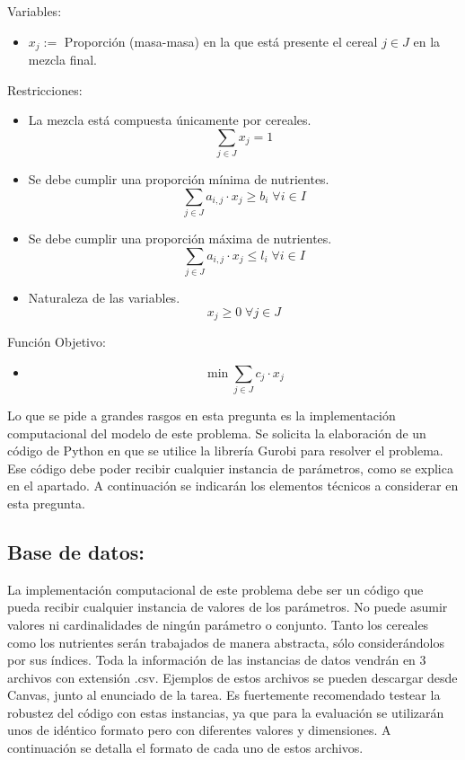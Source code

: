 \documentclass[addpoints,10pt]{exam}
\begin{document}
\begin{questions}
Variables:\\
\begin{itemize}
            \item $x_{j} :=$ Proporción (masa-masa) en la que está presente el cereal $j \in J$ en la mezcla final.
\end{itemize}
Restricciones:
\begin{itemize}
            \item La mezcla está compuesta únicamente por cereales.
            \[ \sum_{j\in J} x_{j} =1 \]            
            \item Se debe cumplir una proporción mínima de nutrientes.
            \[\sum_{j \in J} a_{i,j}\cdot x_{j} \geq b_i \; \forall i \in I \]
            \item Se debe cumplir una proporción máxima de nutrientes.
            \[\sum_{j\in J} a_{i,j}\cdot x_j \leq l_i \; \forall i \in I \]
            \item Naturaleza de las variables.
            \[ x_j \geq 0 \; \forall j \in J \]
\end{itemize}
Función Objetivo:
\begin{itemize}
            \item 
            \[\min \sum_{j \in J} c_j \cdot x_{j} \]
\end{itemize}


Lo que se pide a grandes rasgos en esta pregunta es la implementación computacional del modelo de este problema. Se solicita la elaboración de un código de Python en que se utilice la librería Gurobi para resolver el problema. Ese código debe poder recibir cualquier instancia de parámetros, como se explica en el apartado. A continuación se indicarán los elementos técnicos a considerar en esta pregunta.\\

\subsection{Base de datos:}

La implementación computacional de este problema debe ser un código que pueda recibir cualquier instancia de valores de los parámetros. No puede asumir valores ni cardinalidades de ningún parámetro o conjunto. Tanto los cereales como los nutrientes serán trabajados de manera abstracta, sólo considerándolos por sus índices. Toda la información de las instancias de datos vendrán en 3 archivos con extensión .csv. Ejemplos de estos archivos se pueden descargar desde Canvas, junto al enunciado de la tarea. Es fuertemente recomendado testear la robustez del código con estas instancias, ya que para la evaluación se utilizarán unos de idéntico formato pero con diferentes valores y dimensiones. A continuación se detalla el formato de cada uno de estos archivos.


\end{questions}
\end{document}
